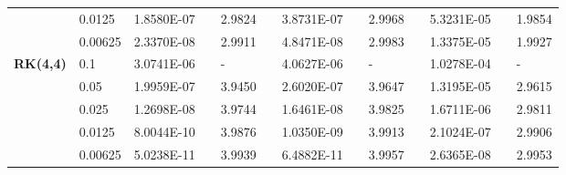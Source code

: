 \documentclass[aspectratio=169]{beamer}
\numberwithin{theorem}{section} %
\numberwithin{equation}{section}%
\numberwithin{figure}{section}%
\numberwithin{table}{section}%
\begin{document}
\begin{frame}
\begin{table}[H]
\begin{tabular}{lllllrlrlrlrlrl}
		\multicolumn{2}{l}{} & \multicolumn{2}{l}{0.0125} & 1.8580E-07 &       & 2.9824  &       & 3.8731E-07 &       & 2.9968  &       & 5.3231E-05 &       & 1.9854  \\
		\multicolumn{2}{l}{} & \multicolumn{2}{l}{0.00625} & 2.3370E-08 &       & 2.9911  &       & 4.8471E-08 &       & 2.9983  &       & 1.3375E-05 &       & 1.9927  \\
		\multicolumn{2}{l}{\multirow{5}[1]{*}{\textbf{RK(4,4)}}} & \multicolumn{2}{l}{0.1} & 3.0741E-06 &       & -     &       & 4.0627E-06 &       & -     &       & 1.0278E-04 &       & - \\
		\multicolumn{2}{l}{} & \multicolumn{2}{l}{0.05} & 1.9959E-07 &       & 3.9450  &       & 2.6020E-07 &       & 3.9647  &       & 1.3195E-05 &       & 2.9615  \\
		\multicolumn{2}{l}{} & \multicolumn{2}{l}{0.025} & 1.2698E-08 &       & 3.9744  &       & 1.6461E-08 &       & 3.9825  &       & 1.6711E-06 &       & 2.9811  \\
		\multicolumn{2}{l}{} & \multicolumn{2}{l}{0.0125} & 8.0044E-10 &       & 3.9876  &       & 1.0350E-09 &       & 3.9913  &       & 2.1024E-07 &       & 2.9906  \\
		\multicolumn{2}{l}{} & \multicolumn{2}{l}{0.00625} & 5.0238E-11 &       & 3.9939  &       & 6.4882E-11 &       & 3.9957  &       & 2.6365E-08 &       & 2.9953  \\
		\bottomrule
		\end{tabular}%
		\label{tab_SAVRRK:6-4}%
		\end{table}%
\end{frame}
\end{document}
